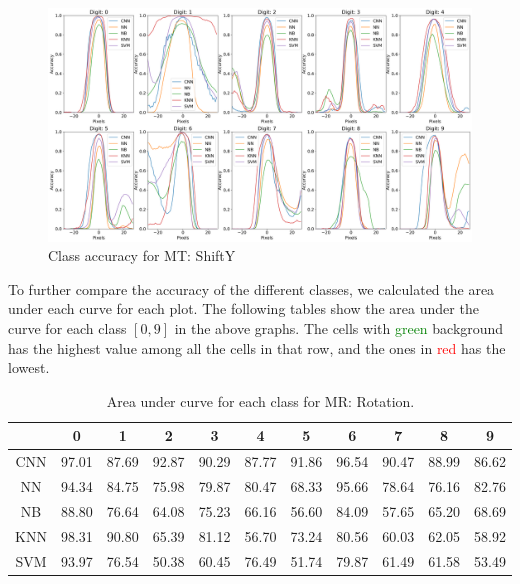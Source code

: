     \begin{figure}[H]
    \centering
        \includegraphics[width=\textwidth]{chapters/results/MT/ShiftYAll.png}
        \caption{Class accuracy for MT: ShiftY}
        \label{fig:Digit by misclassification for ShiftY MR}
    \end{figure}
    
  To further compare the accuracy of the different classes, we calculated the area under each curve for each plot. The following tables show the area under the curve for each class $[0,9]$ in the above graphs. The cells with \textcolor{green}{green} background has the highest value among all the cells in that row, and the ones in \textcolor{red}{red} has the lowest.
    \begin{table}[H]
    \centering
        \begin{tabular}{|c|c|c|c|c|c|c|c|c|c|c|}
        \hline
         & 0 & 1 & 2 & 3 & 4 & 5 & 6 & 7 & 8 & 9 \\
        \hline
        CNN & \cellcolor{green!25} 97.01 & 87.69 & 92.87 & 90.29 & 87.77 & 91.86 & 96.54 & 90.47 & 88.99 & \cellcolor{red!25}86.62 \\ 
        \hline
        NN &   94.34 & 84.75 & 75.98 & 79.87 & 80.47 & \cellcolor{red!25}68.33 & \cellcolor{green!25}95.66 & 78.64 & 76.16 & 82.76 \\
        \hline
        NB & \cellcolor{green!25}88.80 & 76.64 & 64.08 & 75.23 & 66.16 & \cellcolor{red!25}56.60 & 84.09 & 57.65 & 65.20 & 68.69 \\
        \hline
        KNN & \cellcolor{green!25}98.31 & 90.80 & 65.39 & 81.12 & \cellcolor{red!25}56.70 & 73.24 & 80.56 & 60.03 & 62.05 & 58.92 \\
        \hline
        SVM & \cellcolor{green!25}93.97 & 76.54 & \cellcolor{red!25}50.38 & 60.45 & 76.49 & 51.74 & 79.87 & 61.49 & 61.58 & 53.49 \\
        \hline
        \end{tabular}
        \caption{Area under curve for each class for MR: Rotation.}
        \label{tbl:test-file-formatRotate}
    \end{table}
    
